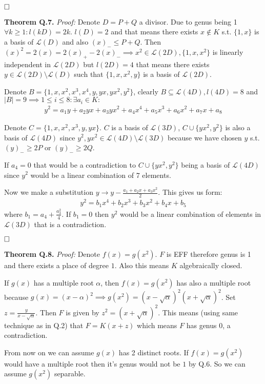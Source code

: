 \documentclass[12pt, a4paper]{article}
\newcommand{\qed}{\hfill\square}
\begin{document}
$\qed$

\textbf{Theorem Q.7.} \textit{Proof:}
Denote $D = P + Q$ a divisor. Due to genus being 1 $\forall k\geq 1: l(kD) = 2k$. $l(D)=2$ and that means there exists $x \notin K$ s.t. $\{1,x\}$ is a basis of $\mathcal{L}(D)$ and also $(x)_{-} \leq P+Q$. Then $(x)^2 = 2(x) = 2(x)_{+}-2(x)_{-} \implies x^2 \in \mathcal{L}(2D),\{1,x,x^2\}$ is linearly independent in $\mathcal{L}(2D)$ but $l(2D)=4$ that means there exists $y \in \mathcal{L}(2D)\setminus \mathcal{L}(D)$ such that $\{1,x,x^2,y\}$ is a basis of $\mathcal{L}(2D)$. 

Denote $B = \{1,x,x^2,x^3,x^4,y,yx,yx^2,y^2\}$, clearly $B \subseteq \mathcal{L}(4D), l(4D)=8$ and $|B|=9 \implies 1 \leq i \leq 8: \exists a_i \in K:$
\begin{gather*}
y^2 = a_1y + a_2yx + a_3yx^2 + a_4x^4 + a_5x^3 + a_6x^2 + a_7x+ a_8
\end{gather*}

Denote $C = \{1,x,x^2,x^3,y,yx\}$. $C$ is a basis of $\mathcal{L}(3D)$, $C \cup \{yx^2,y^2\}$ is also a basis of $\mathcal{L}(4D)$ since $y^2,yx^2 \in \mathcal{L}(4D) \setminus \mathcal{L}(3D)$ because we have chosen $y$ s.t. $(y)_{-} \geq 2P$ or $(y)_{-} \geq 2Q$.

If $a_4=0$ that would be a contradiction to $C \cup \{yx^2,y^2\}$ being a basis of $\mathcal{L}(4D)$ since $y^2$ would be a linear combination of 7 elements.

Now we make a substitution $y \rightarrow y - \frac{a_1+a_2x+a_3x^2}{2}$. This gives us form:
\begin{gather*}
y^2 =b_1x^4 + b_2x^3 + b_3x^2 + b_4x+ b_5
\end{gather*}
where $b_1 = a_4+\frac{a_3^2}{4}$. If $b_1=0$ then $y^2$ would be a linear combination of elements in $\mathcal{L}(3D)$ that is a contradiction.

$\qed$

\textbf{Theorem Q.8.} \textit{Proof:}
Denote $f(x) = g(x^2)$. $F$ is EFF therefore genus is 1 and there exists a place of degree $1$. Also this means $K$ algebraically closed.

If $g(x)$ has a multiple root $\alpha$, then $f(x)=g(x^2)$ has also a multiple root because $g(x)=(x-\alpha)^2 \implies g(x^2) = (x-\sqrt{\alpha})^2(x+\sqrt{\alpha})^2$. Set $z = \frac{y}{x-\sqrt{\alpha}}$. Then $F$ is given by $z^2=(x+\sqrt{\alpha})^2$. This means (using same technique as in Q.2) that $F = K(x+z)$ which means $F$ has genus 0, a contradiction.

From now on we can assume $g(x)$ has 2 distinct roots. If $f(x)=g(x^2)$ would have a multiple root then it's genus would not be $1$ by Q.6. So we can assume $g(x^2)$ separable. 
\end{document}
